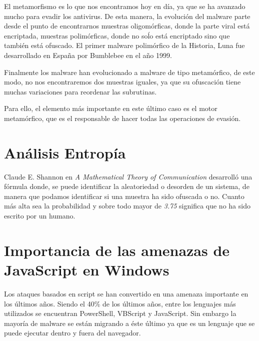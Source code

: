 \documentclass[a4paper]{article}
\begin{document}
	El metamorfismo es lo que nos encontramos hoy en día, ya que se ha avanzado mucho para evadir los antivirus. De esta manera, la evolución del malware parte desde el punto de encontrarnos muestras oligomórficas, donde la parte viral está encriptada, muestras polimórficas, donde no soĺo está encriptado sino que también está ofuscado. El primer malware polimórfico de la Historia, Luna fue desarrollado en España por Bumblebee en el año 1999. 
	
	Finalmente los malware han evolucionado a malware de tipo metamórfico, de este modo, no nos encontraremos dos muestras iguales, ya que su ofuscación tiene muchas variaciones para reordenar las subrutinas.
	
	Para ello, el elemento más importante en este último caso es el motor metamórfico, que es el responsable de hacer todas las operaciones de evasión.
	
	\section{Análisis Entropía}
	Claude E. Shannon en \textit{A Mathematical Theory of Communication} desarrolló una fórmula donde, se puede identificar la aleatoriedad o desorden de un sistema, de manera que podamos identificar si una muestra ha sido ofuscada o no. Cuanto más alta sea la probabilidad y sobre todo mayor de \textit{3.75} significa que no ha sido escrito por un humano.
	
	\section{Importancia de las amenazas de JavaScript en Windows}
	Los ataques basados en script se han convertido en una amenaza importante en los últimos años. Siendo el 40\% de los últimos años, entre los lenguajes más utilizados se encuentran PowerShell, VBScript y JavaScript. Sin embargo la mayoría de malware se están migrando a éste último ya que es un lenguaje que se puede ejecutar dentro y fuera del navegador.
	
\end{document}
